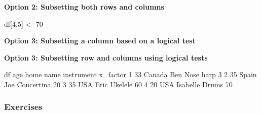 \documentclass[
]{book}
\newenvironment{Shaded}{\begin{snugshade}}{\end{snugshade}}
\newcommand{\DecValTok}[1]{\textcolor[rgb]{0.00,0.00,0.81}{#1}}
\newcommand{\KeywordTok}[1]{\textcolor[rgb]{0.13,0.29,0.53}{\textbf{#1}}}
\newcommand{\NormalTok}[1]{#1}
\newcommand{\OperatorTok}[1]{\textcolor[rgb]{0.81,0.36,0.00}{\textbf{#1}}}
\newcommand{\StringTok}[1]{\textcolor[rgb]{0.31,0.60,0.02}{#1}}
\begin{document}
\textbf{Option 2: Subsetting both rows and columns}

\begin{Shaded}
\begin{Highlighting}[]
\NormalTok{df[}\DecValTok{4}\NormalTok{,}\DecValTok{5}\NormalTok{] <-}\StringTok{ }\DecValTok{70}
\end{Highlighting}
\end{Shaded}

\textbf{Option 3: Subsetting a column based on a logical test}

\begin{Shaded}
\end{Shaded}

\textbf{Option 3: Subsetting row and columns using logical tests}

\begin{Shaded}
\end{Shaded}

\begin{Shaded}
\begin{Highlighting}[]
\NormalTok{df}
\NormalTok{  age   home     name instrument x_factor}
\DecValTok{1}  \DecValTok{33}\NormalTok{ Canada      Ben  Nose harp        }\DecValTok{3}
\DecValTok{2}  \DecValTok{35}\NormalTok{  Spain      Joe Concertina       }\DecValTok{20}
\DecValTok{3}  \DecValTok{35}\NormalTok{    USA     Eric    Ukelele       }\DecValTok{60}
\DecValTok{4}  \DecValTok{20}\NormalTok{    USA Isabelle      Drums       }\DecValTok{70}
\end{Highlighting}
\end{Shaded}

\hypertarget{exercises-5}{%
\subsubsection*{Exercises}\label{exercises-5}}
\end{document}
